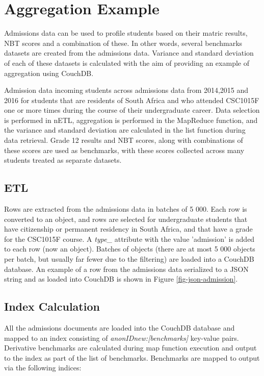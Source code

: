 \section{Aggregation Example}
Admissions data can be used to profile students based on their matric results, NBT scores and a combination of these. In other words, several benchmarks datasets are created from the admissions data. Variance and standard deviation of each of these datasets is calculated with the aim of providing an example of aggregation using CouchDB.

Admission data incoming students across admissions data from 2014,2015 and 2016 for students that are residents of South Africa and who attended CSC1015F one or more times during the course of their undergraduate career. Data selection is performed in nETL, aggregation is performed in the MapReduce function, and the variance and standard deviation are calculated in the list function during data retrieval. Grade 12 results and NBT scores, along with combinations of these scores are used as benchmarks, with these scores collected across many students treated as separate datasets.

\subsection{ETL}
Rows are extracted from the admissions data in batches of 5 000. Each row is converted to an object, and rows are selected for undergraduate students that have citizenship or permanent residency in South Africa, and that have a grade for the CSC1015F course. A \textit{type\_} attribute with the value 'admission' is added to each row (now an object). Batches of objects (there are at most 5 000 objects per batch, but usually far fewer due to the filtering) are loaded into a CouchDB database. An example of a row from the admissions data serialized to a JSON string and as loaded into CouchDB is shown in Figure \ref{fig-json-admission}.



\subsection{Index Calculation}
All the admissions documents are loaded into the CouchDB database and mapped to an index consisting of \textit{anonIDnew:[benchmarks]} key-value pairs. Derivative benchmarks are calculated during map function execution and output to the index as part of the list of benchmarks. Benchmarks are mapped to output via the following indices:

